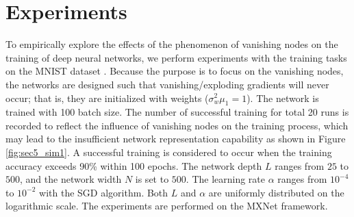 \chapter{Experiments} \label{experiments}



To empirically explore the effects of the phenomenon of vanishing nodes on the training of deep neural networks, we perform experiments with the training tasks on the MNIST dataset \cite{mnist}. Because the purpose is to focus on the  vanishing nodes, the networks are designed such that vanishing/exploding gradients will never occur; that is, they are initialized with weights ($\sigma_w^2\mu_1=1$).
The network is trained with 100 batch size.
The number of successful training for total 20 runs is recorded to reflect the influence of vanishing nodes on the training process, which may lead to the insufficient network representation capability  as shown in Figure \ref{fig:sec5_sim1}.
A successful training is considered to occur when the training accuracy exceeds 90\% within 100 epochs. 
The network depth $L$ ranges from $25$ to $500$, and the network width $N$ is set to $500$.
The learning rate $\alpha$ ranges from $10^{-4}$ to $10^{-2}$ with the SGD algorithm.
Both $L$ and $\alpha$ are uniformly distributed on the logarithmic scale.
The experiments are performed on the MXNet framework\cite{mxnet}.


